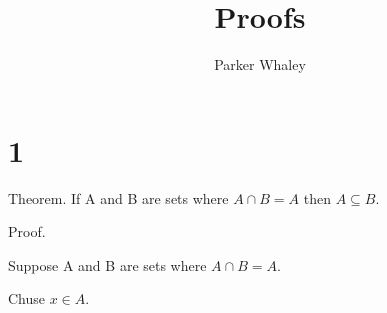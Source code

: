 \documentclass[10pt,a4paper]{article}
\author{Parker Whaley}
\title{Proofs}
\begin{document}
\maketitle

\section{1}
Theorem. If A and B are sets where $A\cap B=A$ then $A \subseteq B$.

Proof.

Suppose A and B are sets where $A\cap B=A$.

Chuse $x\in A$.  
\end{document}
